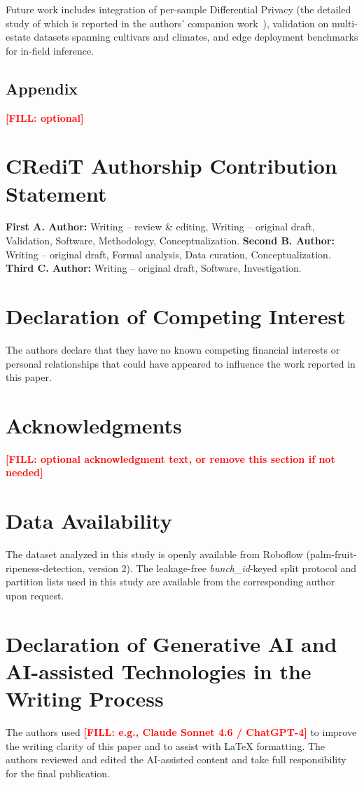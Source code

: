 \documentclass[a4paper,10pt]{article}
\newcommand{\tbd}[1]{\textcolor{red}{\textbf{[FILL: #1]}}}
\begin{document}
Future work includes integration of per-sample Differential Privacy (the
detailed study of which is reported in the authors' companion
work~\cite{paperA}), validation on multi-estate datasets spanning cultivars
and climates, and edge deployment benchmarks for in-field inference.

\subsection*{Appendix}
\tbd{optional}

\section*{CRediT Authorship Contribution Statement}
\textbf{First A. Author:} Writing -- review \& editing, Writing -- original
draft, Validation, Software, Methodology, Conceptualization.
\textbf{Second B. Author:} Writing -- original draft, Formal analysis, Data
curation, Conceptualization.
\textbf{Third C. Author:} Writing -- original draft, Software, Investigation.

\section*{Declaration of Competing Interest}
The authors declare that they have no known competing financial interests or
personal relationships that could have appeared to influence the work reported
in this paper.

\section*{Acknowledgments}
\tbd{optional acknowledgment text, or remove this section if not needed}

\section*{Data Availability}
The dataset analyzed in this study is openly available from Roboflow
(palm-fruit-ripeness-detection, version 2). The leakage-free
\textit{bunch\_id}-keyed split protocol and partition lists used in this
study are available from the corresponding author upon request.

\section*{Declaration of Generative AI and AI-assisted Technologies in the Writing Process}
The authors used \tbd{e.g., Claude Sonnet 4.6 / ChatGPT-4} to improve the
writing clarity of this paper and to assist with LaTeX formatting. The authors
reviewed and edited the AI-assisted content and take full responsibility for
the final publication.
\end{document}
